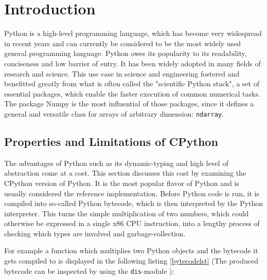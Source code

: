 \documentclass[english,11pt,a4paper,table]{article} %
\let\stdsection\section %
\renewcommand\section{\clearpage\newpage\stdsection} %
\begin{document}




\section{Introduction}
\label{intro}

Python is a high-level programming language,
which has become very widespread in recent years and can currently be considered to
be the most widely used general programming language. \cite{tiobe_2022}
Python owes its popularity to its readability, conciseness and low barrier of entry.
It has been widely adopted in many fields of research and science.
This use case in science and engineering fostered and benefitted greatly from what is often called the "scientific Python stack",
a set of essential packages, which enable the faster execution of common numerical tasks.
The package Numpy \cite{numpy} is the most influential of those packages, since it defines
a general and versatile class for arrays of arbitrary dimension: \texttt{ndarray}\cite{ndarray}.

\subsection{Properties and Limitations of CPython}
\label{dis}

The advantages of Python such as its dynamic-typing and high level of abstraction come at a cost.
This section discusses this cost by examining the CPython version of Python.
It is the most popular flavor of Python and is usually considered the reference implementation.
Before Python code is run, it is compiled into so-called Python bytecode, which is then interpreted
by the Python interpreter. This turns the simple multiplication of two numbers,
which could otherwise be expressed in a single x86 CPU instruction, into a lengthy process of checking
which types are involved and garbage-collection.

For example a function which multiplies two Python objects and the bytecode it gets compiled to is displayed in the following listing \ref{bytecodelst} (The produced bytecode can be inspected by using the \texttt{dis}-module \cite{dis}):
\end{document}
